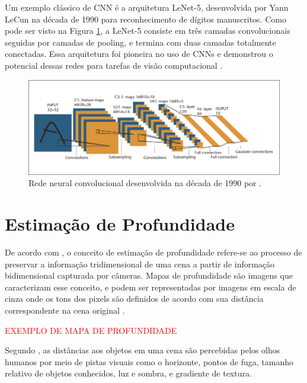 Um exemplo clássico de CNN é a arquitetura LeNet-5, desenvolvida por Yann LeCun na década de 1990 para reconhecimento de dígitos manuscritos. Como pode ser visto na Figura \ref{fig:lenet5}, a LeNet-5 consiste em três camadas convolucionais seguidas por camadas de pooling, e termina com duas camadas totalmente conectadas. Essa arquitetura foi pioneira no uso de CNNs e demonstrou o potencial dessas redes para tarefas de visão computacional \cite{lecun1998gradient}.

\begin{figure}
    \centering   
    \includegraphics[width=\textwidth]{fig/A-Convolutional-Neural-Net-LeNet-5-From-Lecun-et-al-1998-C1998-IEEE-reprinted.png}
    \caption{Rede neural convolucional desenvolvida na década de 1990 por .}
    \label{fig:lenet5}
\end{figure}


\section{Estimação de Profundidade}


De acordo com , o conceito de estimação de profundidade refere-se ao processo de preservar a informação tridimensional de uma cena a partir de informação bidimensional capturada por câmeras. Mapas de profundidade são imagens que caracterizam esse conceito, e podem ser representadas por imagens em escala de cinza onde os tons dos pixels são definidos de acordo com sua distância correspondente na cena original \cite{dourado2020multi}. 

\textcolor{red}{EXEMPLO DE MAPA DE PROFUNDIDADE}



Segundo , as distâncias aos objetos em uma cena são percebidas pelos olhos humanos por meio de pistas visuais como o horizonte, pontos de fuga, tamanho relativo de objetos conhecidos, luz e sombra, e gradiente de textura.  

